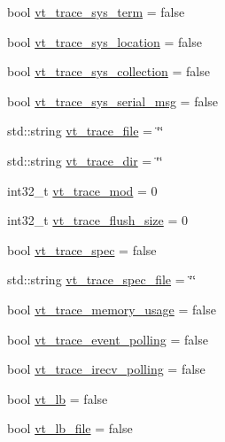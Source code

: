 \begin{DoxyCompactItemize}
\item 
bool \hyperlink{structvt_1_1arguments_1_1_app_config_a723e9f8cd1422d47d0294dcb951261f7}{vt\+\_\+trace\+\_\+sys\+\_\+term} = false
\item 
bool \hyperlink{structvt_1_1arguments_1_1_app_config_a91260efaad41abe7d191ba4771b45785}{vt\+\_\+trace\+\_\+sys\+\_\+location} = false
\item 
bool \hyperlink{structvt_1_1arguments_1_1_app_config_a50becf5c6101368f5d9c6884e190fed3}{vt\+\_\+trace\+\_\+sys\+\_\+collection} = false
\item 
bool \hyperlink{structvt_1_1arguments_1_1_app_config_a50afef339e662908db55e0d60bde2d40}{vt\+\_\+trace\+\_\+sys\+\_\+serial\+\_\+msg} = false
\item 
std\+::string \hyperlink{structvt_1_1arguments_1_1_app_config_ad445cf8321e97a3e5da0fa7923690fa8}{vt\+\_\+trace\+\_\+file} = \char`\"{}\char`\"{}
\item 
std\+::string \hyperlink{structvt_1_1arguments_1_1_app_config_a05efd2295aa43237c029cc2b24f0e788}{vt\+\_\+trace\+\_\+dir} = \char`\"{}\char`\"{}
\item 
int32\+\_\+t \hyperlink{structvt_1_1arguments_1_1_app_config_afa2e36bf17ed46ca812263f523533353}{vt\+\_\+trace\+\_\+mod} = 0
\item 
int32\+\_\+t \hyperlink{structvt_1_1arguments_1_1_app_config_a537883e43e43508431626e90886edd92}{vt\+\_\+trace\+\_\+flush\+\_\+size} = 0
\item 
bool \hyperlink{structvt_1_1arguments_1_1_app_config_ade1d955e557ed03865dbb4317bb69c22}{vt\+\_\+trace\+\_\+spec} = false
\item 
std\+::string \hyperlink{structvt_1_1arguments_1_1_app_config_abd5bcb7a9ca53be8eafc28e2cbd18290}{vt\+\_\+trace\+\_\+spec\+\_\+file} = \char`\"{}\char`\"{}
\item 
bool \hyperlink{structvt_1_1arguments_1_1_app_config_a39c140474cc43ea0d8bca36359ffd86a}{vt\+\_\+trace\+\_\+memory\+\_\+usage} = false
\item 
bool \hyperlink{structvt_1_1arguments_1_1_app_config_a43da3e179ed4ad72411a41b46fae97e0}{vt\+\_\+trace\+\_\+event\+\_\+polling} = false
\item 
bool \hyperlink{structvt_1_1arguments_1_1_app_config_a7753691852b0b5475c953789173cf555}{vt\+\_\+trace\+\_\+irecv\+\_\+polling} = false
\item 
bool \hyperlink{structvt_1_1arguments_1_1_app_config_a7f1564af24349d7f524f7b509d92fd22}{vt\+\_\+lb} = false
\item 
bool \hyperlink{structvt_1_1arguments_1_1_app_config_a0a03591645fb35a5a90d18564c8018fa}{vt\+\_\+lb\+\_\+file} = false

\end{DoxyCompactItemize}
